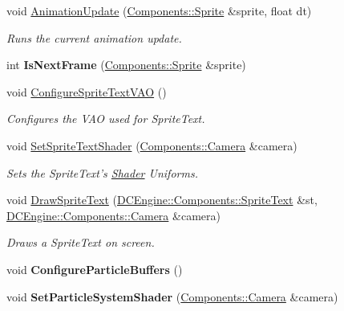 \begin{DoxyCompactItemize}
void \hyperlink{classDCEngine_1_1Systems_1_1GraphicsGL_a05cb70091e1c5038a24c5abe887239d3}{Animation\-Update} (\hyperlink{classDCEngine_1_1Components_1_1Sprite}{Components\-::\-Sprite} \&sprite, float dt)
\begin{DoxyCompactList}\small\item\em Runs the current animation update. \end{DoxyCompactList}\item 
\hypertarget{classDCEngine_1_1Systems_1_1GraphicsGL_a50d6fe6205e5533ceed8eb13b580d9fc}{int {\bfseries Is\-Next\-Frame} (\hyperlink{classDCEngine_1_1Components_1_1Sprite}{Components\-::\-Sprite} \&sprite)}\label{classDCEngine_1_1Systems_1_1GraphicsGL_a50d6fe6205e5533ceed8eb13b580d9fc}

\item 
void \hyperlink{classDCEngine_1_1Systems_1_1GraphicsGL_ad76646900d9d276d5e23de98561654a1}{Configure\-Sprite\-Text\-V\-A\-O} ()
\begin{DoxyCompactList}\small\item\em Configures the V\-A\-O used for Sprite\-Text. \end{DoxyCompactList}\item 
void \hyperlink{classDCEngine_1_1Systems_1_1GraphicsGL_aa2cc15a6f58c1a5081f5ace32b2a8ce4}{Set\-Sprite\-Text\-Shader} (\hyperlink{classDCEngine_1_1Components_1_1Camera}{Components\-::\-Camera} \&camera)
\begin{DoxyCompactList}\small\item\em Sets the Sprite\-Text's \hyperlink{classDCEngine_1_1Shader}{Shader} Uniforms.  \end{DoxyCompactList}\item 
void \hyperlink{classDCEngine_1_1Systems_1_1GraphicsGL_ab4e1b5fbc5b43c6670a441ccd1e5338d}{Draw\-Sprite\-Text} (\hyperlink{classDCEngine_1_1Components_1_1SpriteText}{D\-C\-Engine\-::\-Components\-::\-Sprite\-Text} \&st, \hyperlink{classDCEngine_1_1Components_1_1Camera}{D\-C\-Engine\-::\-Components\-::\-Camera} \&camera)
\begin{DoxyCompactList}\small\item\em Draws a Sprite\-Text on screen. \end{DoxyCompactList}\item 
\hypertarget{classDCEngine_1_1Systems_1_1GraphicsGL_aa2e63f43ed95a11125c36dd4b1be5bf1}{void {\bfseries Configure\-Particle\-Buffers} ()}\label{classDCEngine_1_1Systems_1_1GraphicsGL_aa2e63f43ed95a11125c36dd4b1be5bf1}

\item 
\hypertarget{classDCEngine_1_1Systems_1_1GraphicsGL_a4d61856ec34482a96a005f043fef6a8b}{void {\bfseries Set\-Particle\-System\-Shader} (\hyperlink{classDCEngine_1_1Components_1_1Camera}{Components\-::\-Camera} \&camera)}\label{classDCEngine_1_1Systems_1_1GraphicsGL_a4d61856ec34482a96a005f043fef6a8b}


\end{DoxyCompactItemize}
